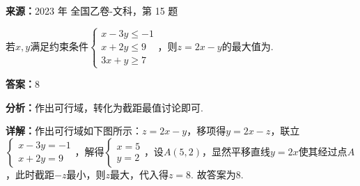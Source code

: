 \begin{question}[points=5]
\textbf{来源：}2023 年 全国乙卷-文科，第 15 题\par
若$x,y$满足约束条件$\begin{cases}x-3y\le-1\\x+2y\le9\\3x+y\ge7\end{cases}$，则$z=2x-y$的最大值为.
\fillin[{$8$}]
\begin{solution}
\textbf{答案：}$8$

\textbf{分析：}作出可行域，转化为截距最值讨论即可.

\textbf{详解：}作出可行域如下图所示：$z=2x-y$，移项得$y=2x-z$，联立$\begin{cases}x-3y=-1\\x+2y=9\end{cases}$，解得$\begin{cases}x=5\\y=2\end{cases}$，设$A(5,2)$，显然平移直线$y=2x$使其经过点$A$，此时截距$-z$最小，则$z$最大，代入得$z=8$. 故答案为8.
\end{solution}
\end{question}

